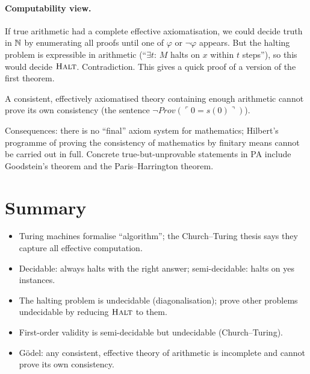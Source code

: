 \paragraph{Computability view.} If true arithmetic had a complete effective
axiomatisation, we could decide truth in $\mathbb{N}$ by enumerating all proofs until one of
$\varphi$ or $\neg\varphi$ appears. But the halting problem is expressible in arithmetic
(``$\exists t$: $M$ halts on $x$ within $t$ steps''), so this would decide
$\textsc{Halt}$. Contradiction. This gives a quick proof of a version of the first
theorem.

\begin{theorem}
A consistent, effectively axiomatised theory containing enough arithmetic cannot prove
its own consistency (the sentence $\neg\mathit{Prov}(\ulcorner 0=s(0)\urcorner)$).
\end{theorem}

\begin{aside}
Consequences: there is no ``final'' axiom system for mathematics; Hilbert's programme of
proving the consistency of mathematics by finitary means cannot be carried out in full.
Concrete true-but-unprovable statements in PA include Goodstein's theorem and the
Paris--Harrington theorem.
\end{aside}

\section*{Summary}
\begin{itemize}
  \item Turing machines formalise ``algorithm''; the Church--Turing thesis says they
        capture all effective computation.
  \item Decidable: always halts with the right answer; semi-decidable: halts on yes
        instances.
  \item The halting problem is undecidable (diagonalisation); prove other problems
        undecidable by reducing $\textsc{Halt}$ to them.
  \item First-order validity is semi-decidable but undecidable (Church--Turing).
  \item G\"odel: any consistent, effective theory of arithmetic is incomplete and cannot
        prove its own consistency.
\end{itemize}
